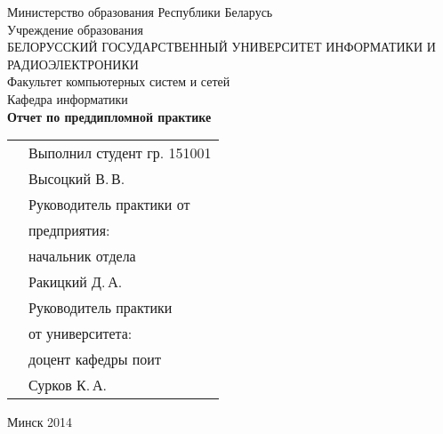 \begin{titlepage}
    
    \begin{center}
        Министерство образования Республики Беларусь \\[0.4cm] 

        Учреждение образования \\

        \MakeUppercase{БЕЛОРУССКИЙ ГОСУДАРСТВЕННЫЙ УНИВЕРСИТЕТ ИНФОРМАТИКИ И РАДИОЭЛЕКТРОНИКИ} \\[0.4cm]

        Факультет компьютерных систем и сетей \\[0.4cm]

        Кафедра информатики \\[3.4cm] %

        {\large\bfseries{Отчет по преддипломной практике}} \\[2cm]

        \noindent
        \begin{tabular}{p{}p{}}
            & Выполнил студент гр. 151001 \\
            & Высоцкий В.\,В. \\[1cm]

            & Руководитель практики от \\
            & предприятия: \\
            & начальник отдела \\
            & Ракицкий Д.\,А. \\[1cm]

            & Руководитель практики \\
            & от университета: \\
            & доцент кафедры поит \\
            & Сурков К.\,А. \\
        \end{tabular}

        \vfill

        {\normalsize Минск 2014}
    \end{center}

\end{titlepage}
